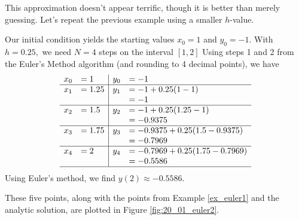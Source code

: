 
This approximation doesn't appear terrific, though it is better than merely guessing. 
\enlargethispage{3\baselineskip}%
Let's repeat the previous example using a smaller $h$-value.\\

{Our initial condition yields the starting values $x_0 = 1$ and $y_0 = -1$.  With $h = 0.25,$ we need $N=4$ steps on the interval $[1,2]$  Using steps 1 and 2 from the Euler's Method algorithm (and rounding to 4 decimal points), we have
\[
\begin{array}{rl | rl}
x_0  &= 1			& 	y_0	&= -1\\ \hline
x_1 	&= 1.25		&	y_1 	&= -1 + 0.25(1 - 1)\\
	&			&		&= -1\\ \hline
x_2 	&= 1.5 		& 	y_2 	&= -1 + 0.25(1.25-1)\\
	&			&		&= -0.9375\\ \hline
x_3	&= 1.75		&	y_3 	&= -0.9375 + 0.25(1.5-0.9375)\\
	&			&		&= -0.7969\\ \hline
x_4	&= 2			&	y_4	&= -0.7969 + 0.25(1.75 - 0.7969)\\
	&			&		&= -0.5586\\ \hline
\end{array}
\]
Using Euler's method, we find  $y(2) \approx -0.5586.$

These five points, along with the points from Example \ref{ex_euler1} and the analytic solution, are plotted in Figure \ref{fig:20_01_euler2}.
}\\


